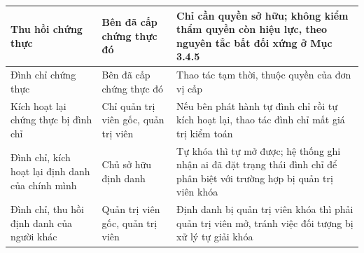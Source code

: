 \begin{longtable}{|p{4.3cm}|p{3.2cm}|p{6.5cm}|}
Thu hồi chứng thực
& Bên đã cấp chứng thực đó
& Chỉ cần quyền sở hữu; không kiểm thẩm quyền còn hiệu lực, theo nguyên tắc bất đối xứng ở Mục 3.4.5
\\ \hline

Đình chỉ chứng thực
& Bên đã cấp chứng thực đó
& Thao tác tạm thời, thuộc quyền của đơn vị cấp
\\ \hline

Kích hoạt lại chứng thực bị đình chỉ
& Chỉ quản trị viên gốc, quản trị viên
& Nếu bên phát hành tự đình chỉ rồi tự kích hoạt lại, thao tác đình chỉ mất giá trị kiểm toán
\\ \hline

Đình chỉ, kích hoạt lại định danh của chính mình
& Chủ sở hữu định danh
& Tự khóa thì tự mở được; hệ thống ghi nhận ai đã đặt trạng thái đình chỉ để phân biệt với trường hợp bị quản trị viên khóa
\\ \hline

Đình chỉ, thu hồi định danh của người khác
& Quản trị viên gốc, quản trị viên
& Định danh bị quản trị viên khóa thì phải quản trị viên mở, tránh việc đối tượng bị xử lý tự giải khóa
\\ \hline

\end{longtable}
